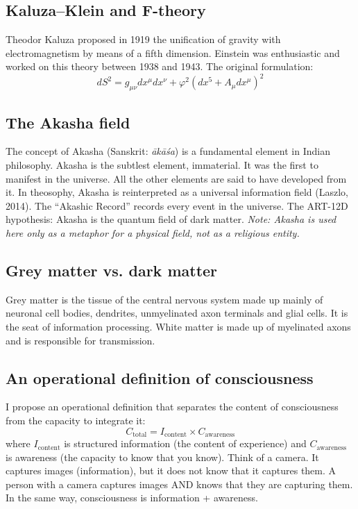 \subsection{Kaluza--Klein and F-theory}
Theodor Kaluza proposed in 1919 the unification of gravity with electromagnetism by means of a fifth dimension. Einstein was enthusiastic and worked on this theory between 1938 and 1943. The original formulation:
\begin{equation}
dS^2 = g_{\mu\nu} dx^\mu dx^\nu + \varphi^2(dx^5 + A_{\mu} dx^\mu)^2
\end{equation}

\subsection{The Akasha field}
The concept of Akasha (Sanskrit: \emph{ākāśa}) is a fundamental element in Indian philosophy. Akasha is the subtlest element, immaterial. It was the first to manifest in the universe. All the other elements are said to have developed from it. In theosophy, Akasha is reinterpreted as a universal information field (Laszlo, 2014). The ``Akashic Record'' records every event in the universe. The ART-12D hypothesis: Akasha is the quantum field of dark matter. \textit{Note: Akasha is used here only as a metaphor for a physical field, not as a religious entity.}

\subsection{Grey matter vs. dark matter}
Grey matter is the tissue of the central nervous system made up mainly of neuronal cell bodies, dendrites, unmyelinated axon terminals and glial cells. It is the seat of information processing. White matter is made up of myelinated axons and is responsible for transmission.

\subsection{An operational definition of consciousness}
I propose an operational definition that separates the content of consciousness from the capacity to integrate it:
\begin{equation}
C_{\text{total}} = I_{\text{content}} \times C_{\text{awareness}}
\end{equation}
where $I_{\text{content}}$ is structured information (the content of experience) and $C_{\text{awareness}}$ is awareness (the capacity to know that you know). Think of a camera. It captures images (information), but it does not know that it captures them. A person with a camera captures images AND knows that they are capturing them. In the same way, consciousness is information + awareness.


